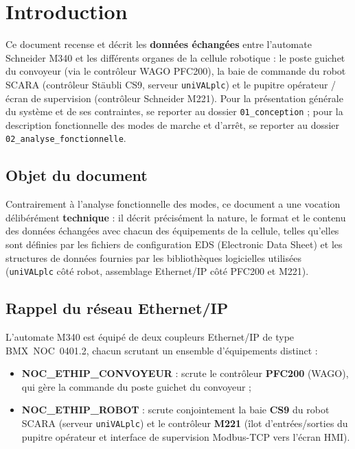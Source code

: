 \section{Introduction}

Ce document recense et décrit les \textbf{données échangées} entre l'automate
Schneider M340 et les différents organes de la cellule robotique : le poste
guichet du convoyeur (via le contrôleur WAGO PFC200), la baie de commande du
robot SCARA (contrôleur Stäubli CS9, serveur \texttt{uniVALplc}) et le pupitre
opérateur / écran de supervision (contrôleur Schneider M221). Pour la
présentation générale du système et de ses contraintes, se reporter au dossier
\texttt{01\_conception} ; pour la description fonctionnelle des modes de
marche et d'arrêt, se reporter au dossier \texttt{02\_analyse\_fonctionnelle}.

\subsection{Objet du document}

Contrairement à l'analyse fonctionnelle des modes, ce document a une vocation
délibérément \textbf{technique} : il décrit précisément la nature, le format
et le contenu des données échangées avec chacun des équipements de la
cellule, telles qu'elles sont définies par les fichiers de configuration
EDS (Electronic Data Sheet) et les structures de données fournies par les
bibliothèques logicielles utilisées (\texttt{uniVALplc} côté robot,
assemblage Ethernet/IP côté PFC200 et M221).

\subsection{Rappel du réseau Ethernet/IP}

L'automate M340 est équipé de deux coupleurs Ethernet/IP de type
BMX~NOC~0401.2, chacun scrutant un ensemble d'équipements distinct :

\begin{itemize}
    \item \textbf{NOC\_ETHIP\_CONVOYEUR} : scrute le contrôleur
    \textbf{PFC200} (WAGO), qui gère la commande du poste guichet du
    convoyeur ;
    \item \textbf{NOC\_ETHIP\_ROBOT} : scrute conjointement la baie
    \textbf{CS9} du robot SCARA (serveur \texttt{uniVALplc}) et le
    contrôleur \textbf{M221} (îlot d'entrées/sorties du pupitre opérateur et
    interface de supervision Modbus-TCP vers l'écran HMI).
\end{itemize}

